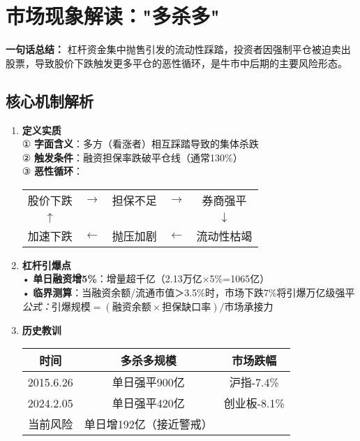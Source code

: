 \section{市场现象解读："多杀多"}
\textbf{一句话总结：}  
杠杆资金集中抛售引发的流动性踩踏，投资者因强制平仓被迫卖出股票，导致股价下跌触发更多平仓的恶性循环，是{\color{red}牛市中后期}的主要风险形态。

\subsection{核心机制解析}
\begin{enumerate}[leftmargin=*, nosep]
    \item \textbf{定义实质}  \\
    ① \textbf{字面含义}：多方（看涨者）相互踩踏导致的集体杀跌\\
    ② \textbf{触发条件}：融资担保率跌破平仓线（通常130\%）\\
    ③ \textbf{恶性循环}：\\
    \begin{tabular}{c c c c c}
        股价下跌 & $\rightarrow$ & 担保不足 & $\rightarrow$ & 券商强平 \\
        $\uparrow$ & & & & $\downarrow$ \\
        加速下跌 & $\leftarrow$ & 抛压加剧 & $\leftarrow$ & 流动性枯竭 \\
    \end{tabular}

    \item \textbf{杠杆引爆点}  \\
    • \textbf{单日融资增5\%}：增量超千亿（2.13万亿×5\%=1065亿）\\
    • \textbf{临界测算}：当融资余额/流通市值＞3.5\%时，市场下跌7\%将引爆万亿级强平\\
    \textit{公式：$ \text{引爆规模} = (\text{融资余额} \times \text{担保缺口率}) / \text{市场承接力} $}
    
    \item \textbf{历史教训}  \\
    
\begin{tabular}{c|c|c}
        时间 & 多杀多规模 & 市场跌幅 \\
        \hline
        2015.6.26 & 单日强平900亿 & 沪指-7.4\% \\
        2024.2.05 & 单日强平420亿 & 创业板-8.1\% \\
        当前风险 & 单日增192亿（接近警戒） & \\
    \end{tabular}
\end{enumerate}

